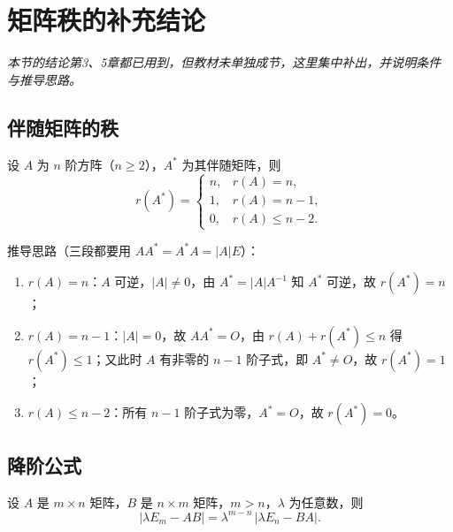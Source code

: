 
\section{矩阵秩的补充结论}
\noindent\textit{本节的结论第3、5章都已用到，但教材未单独成节，这里集中补出，并说明条件与推导思路。}

\subsection{伴随矩阵的秩}

\begin{theorem}
设 $A$ 为 $n$ 阶方阵（$n\ge2$），$A^{*}$ 为其伴随矩阵，则
\[
r(A^{*})=
\begin{cases}
n, & r(A)=n,\\[1mm]
1, & r(A)=n-1,\\[1mm]
0, & r(A)\le n-2.
\end{cases}
\]
\end{theorem}

推导思路（三段都要用 $AA^{*}=A^{*}A=|A|E$）：

\begin{enumerate}
\item $r(A)=n$：$A$ 可逆，$|A|\neq0$，由 $A^{*}=|A|A^{-1}$ 知 $A^{*}$ 可逆，故 $r(A^{*})=n$；
\item $r(A)=n-1$：$|A|=0$，故 $AA^{*}=O$，由 $r(A)+r(A^{*})\le n$ 得 $r(A^{*})\le1$；又此时 $A$ 有非零的 $n-1$ 阶子式，即 $A^{*}\neq O$，故 $r(A^{*})=1$；
\item $r(A)\le n-2$：所有 $n-1$ 阶子式为零，$A^{*}=O$，故 $r(A^{*})=0$。
\end{enumerate}


\subsection{降阶公式}

\begin{theorem}
设 $A$ 是 $m\times n$ 矩阵，$B$ 是 $n\times m$ 矩阵，$m>n$，$\lambda$ 为任意数，则
\[
|\lambda E_m-AB|=\lambda^{m-n}\,|\lambda E_n-BA|.
\]
\end{theorem}

